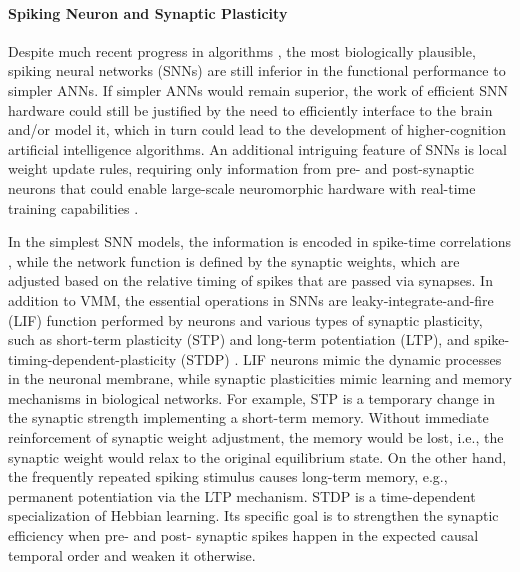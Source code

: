 \paragraph*{Spiking Neuron and Synaptic Plasticity}

Despite much recent progress in algorithms \cite{Neftci2019, Tavanaei2019}, the most biologically plausible, spiking neural networks (SNNs) \cite{Gerstner2002} are still inferior in the functional performance to simpler ANNs. If simpler ANNs would remain superior, the work of efficient SNN hardware could still be justified by the need to efficiently interface to the brain and/or model it, which in turn could lead to the development of higher-cognition artificial intelligence algorithms. An additional intriguing feature of SNNs is local weight update rules, requiring only information from pre- and post-synaptic neurons that could enable large-scale neuromorphic hardware with real-time training capabilities \cite{Thakur2018}. 

In the simplest SNN models, the information is encoded in spike-time correlations \cite{Gerstner2002}, while the network function is defined by the synaptic weights, which are adjusted based on the relative timing of spikes that are passed via synapses. In addition to VMM, the essential operations in SNNs are leaky-integrate-and-fire (LIF) function performed by neurons and various types of synaptic plasticity, such as short-term plasticity (STP) and long-term potentiation (LTP), and spike-timing-dependent-plasticity (STDP) \cite{Gerstner2002}. LIF neurons mimic the dynamic processes in the neuronal membrane, while synaptic plasticities mimic learning and memory mechanisms in biological networks. For example, STP is a temporary change in the synaptic strength implementing a short-term memory. Without immediate reinforcement of synaptic weight adjustment, the memory would be lost, i.e., the synaptic weight would relax to the original equilibrium state. On the other hand, the frequently repeated spiking stimulus causes long-term memory, e.g., permanent potentiation via the LTP mechanism. STDP is a time-dependent specialization of Hebbian learning. Its specific goal is to strengthen the synaptic efficiency when pre- and post- synaptic spikes happen in the expected causal temporal order and weaken it otherwise. 

